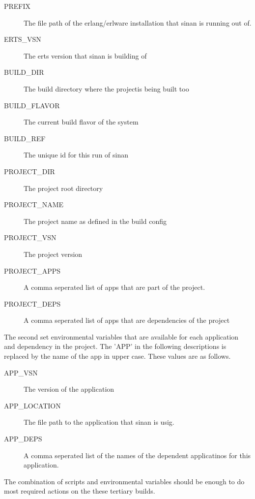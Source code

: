 \documentclass[11pt]{article}
\begin{document}
\begin{description}
\item[PREFIX] The file path of the erlang/erlware installation that
  sinan is running out of.
\item[ERTS\_VSN] The erts version that sinan is building of
\item[BUILD\_DIR] The build directory where the projectis being built
  too
\item[BUILD\_FLAVOR] The current build flavor of the system
\item[BUILD\_REF] The unique id for this run of sinan
\item[PROJECT\_DIR] The project root directory
\item[PROJECT\_NAME] The project name as defined in the build config
\item[PROJECT\_VSN] The project version
\item[PROJECT\_APPS] A comma seperated list of apps that are part of
  the project.
\item[PROJECT\_DEPS] A comma seperated list of apps that are
  dependencies of the project
\end{description}

The second set environmental variables that are available for each
application and dependency in the project. The 'APP' in the following
descriptions is replaced by the name of the app in upper case. These
values are as follows.

\begin{description}
\item[APP\_VSN] The version of the application
\item[APP\_LOCATION] The file path to the application that sinan
  is usig.
\item[APP\_DEPS] A comma seperated list of the names of the
  dependent applicatinos for this application.
\end{description}

The combination of scripts and environmental variables should be
enough to do most required actions on the these tertiary builds.
\end{document}
